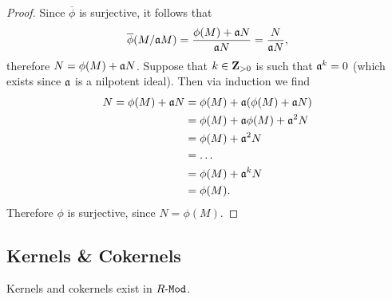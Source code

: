 \begin{proof}
    Since \(\overline{\phi}\) is surjective, it follows that
    \[
        \overline{\phi}(M/\mathfrak{a} M) = \frac{\phi(M) + \mathfrak{a} N}{\mathfrak{a} N}
        = \frac{N}{\mathfrak{a} N},
    \]
    therefore \(N = \phi(M) + \mathfrak{a} N\). Suppose that \(k \in \mathbf{Z}_{> 0}\) is such
    that \(\mathfrak{a}^k = 0\) (which exists since \(\mathfrak{a}\) is a nilpotent
    ideal). Then via induction we find
    \begin{align*}
        N = \phi(M) + \mathfrak{a} N
         & = \phi(M) + \mathfrak{a}(\phi(M) + \mathfrak{a} N)  \\
         & = \phi(M) + \mathfrak{a} \phi(M) + \mathfrak{a}^2 N \\
         & = \phi(M) + \mathfrak{a}^2 N                    \\
         & = \dots                                     \\
         & = \phi(M) + \mathfrak{a}^k N                    \\
         & = \phi(M).
    \end{align*}
    Therefore \(\phi\) is surjective, since \(N = \phi(M)\).
\end{proof}

\subsection{Kernels \& Cokernels}

\begin{lemma}
    \label{lem:ker-coker-exist-in-R-mod}
    Kernels and cokernels exist in \({R\text{-}\texttt{Mod}}\).
\end{lemma}


